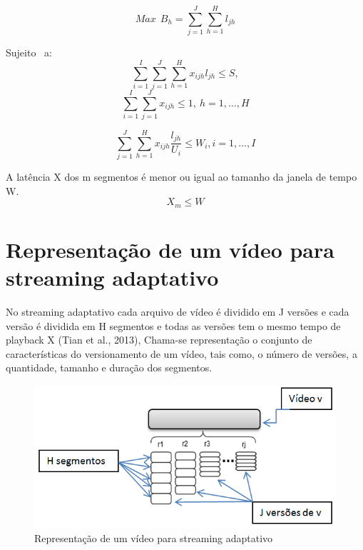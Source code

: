 \documentclass[
	12pt,
	oneside,
	a4paper,
	english,
	brazil
	]{abntex2ppgsi}
\begin{document}
\begin{equation}
Max  \ \ B_h=\sum_{j=1}^{J}\sum_{h=1}^{H}l_{jh}
\end{equation}

Sujeito \ a:
\begin{equation}
\sum_{i=1}^{I}\sum_{j=1}^{J}\sum_{h=1}^{H}x_{ijh}l_{jh} \leq S,
\end{equation}
\begin{equation}
\sum_{i=1}^{I}\sum_{j=1}^{J}x_{ijh} \leq 1 ,\ h = 1, \dots, H
\end{equation}

\begin{equation}
\sum_{j=1}^J\sum_{h=1}^{H}x_{ijh}\frac{l_{jh}}{U_i} \leq W_i ,i = 1, \dots, I
\end{equation}

A latência X dos m segmentos é menor ou igual ao tamanho da janela de tempo W.
\begin{equation}
X_m \leq W
\end{equation}


\section{Representação de um vídeo para streaming adaptativo}

No streaming adaptativo cada arquivo de vídeo é dividido em J versões e cada versão é dividida em H segmentos e todas as versões tem o mesmo tempo de playback X (Tian et al., 2013), Chama-se representação o conjunto de características do versionamento de um vídeo, tais como, o número de versões, a quantidade, tamanho e duração dos segmentos.


\begin{figure}[H]%
	\centering
 	  \caption{Representação de um vídeo para streaming adaptativo}
		\includegraphics{figuras/segmentos.png}
\end{figure}
\end{document}
